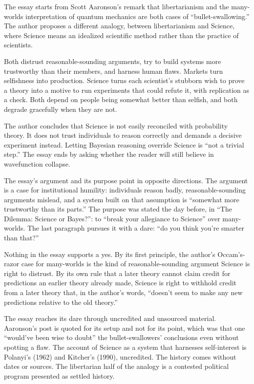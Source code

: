 \begin{afterword}
\summaryhead

The essay starts from Scott Aaronson's remark that libertarianism and the many-worlds interpretation of quantum mechanics are both cases of ``bullet-swallowing.'' The author proposes a different analogy, between libertarianism and Science, where Science means an idealized scientific method rather than the practice of scientists.

Both distrust reasonable-sounding arguments, try to build systems more trustworthy than their members, and harness human flaws. Markets turn selfishness into production. Science turns each scientist's stubborn wish to prove a theory into a motive to run experiments that could refute it, with replication as a check. Both depend on people being somewhat better than selfish, and both degrade gracefully when they are not.

The author concludes that Science is not easily reconciled with probability theory. It does not trust individuals to reason correctly and demands a decisive experiment instead. Letting Bayesian reasoning override Science is ``not a trivial step.'' The essay ends by asking whether the reader will still believe in wavefunction collapse.

\responsehead

The essay's argument and its purpose point in opposite directions. The argument is a case for institutional humility: individuals reason badly, reasonable-sounding arguments mislead, and a system built on that assumption is ``somewhat more trustworthy than its parts.'' The purpose was stated the day before, in ``The Dilemma: Science or Bayes?'': to ``break your allegiance to Science'' over many-worlds. The last paragraph pursues it with a dare: ``do you think you're smarter than that?''

Nothing in the essay supports a yes. By its first principle, the author's Occam's-razor case for many-worlds is the kind of reasonable-sounding argument Science is right to distrust. By its own rule that a later theory cannot claim credit for predictions an earlier theory already made, Science is right to withhold credit from a later theory that, in the author's words, ``doesn't seem to make any new predictions relative to the old theory.''

The essay reaches its dare through uncredited and unsourced material. Aaronson's post is quoted for its setup and not for its point, which was that one ``would've been wise to doubt'' the bullet-swallowers' conclusions even without spotting a flaw. The account of Science as a system that harnesses self-interest is Polanyi's (1962) and Kitcher's (1990), uncredited. The history comes without dates or sources. The libertarian half of the analogy is a contested political program presented as settled history.


\end{afterword}
